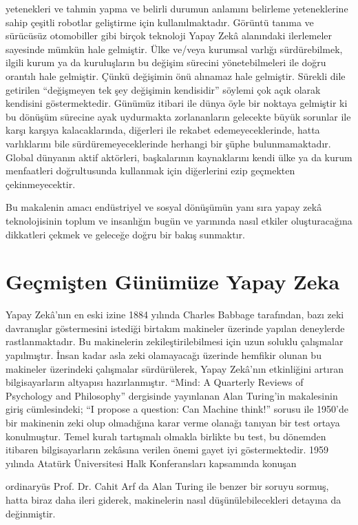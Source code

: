 \documentclass{article}
\begin{document}
\begin{multicols}{2}
yetenekleri ve tahmin yapma ve belirli durumun anlamını belirleme yeteneklerine sahip çeşitli robotlar geliştirme için kullanılmaktadır. Görüntü tanıma ve
sürücüsüz otomobiller gibi birçok teknoloji Yapay Zekâ alanındaki ilerlemeler
sayesinde mümkün hale gelmiştir.
 Ülke ve/veya kurumsal varlığı sürdürebilmek, ilgili
kurum ya da kuruluşların bu değişim sürecini yönetebilmeleri ile doğru orantılı
hale gelmiştir. Çünkü değişimin önü alınamaz hale gelmiştir. Sürekli dile getirilen “değişmeyen tek şey değişimin kendisidir” söylemi çok açık olarak kendisini göstermektedir. Günümüz itibari ile dünya öyle bir noktaya gelmiştir ki bu
dönüşüm sürecine ayak uydurmakta zorlananların gelecekte büyük sorunlar ile
karşı karşıya kalacaklarında, diğerleri ile rekabet edemeyeceklerinde, hatta varlıklarını bile sürdüremeyeceklerinde herhangi bir şüphe bulunmamaktadır. Global dünyanın aktif aktörleri, başkalarının kaynaklarını kendi ülke ya da kurum
menfaatleri doğrultusunda kullanmak için diğerlerini ezip geçmekten çekinmeyecektir.

\vspace{10pt}
Bu makalenin amacı endüstriyel ve sosyal dönüşümün yanı sıra yapay zekâ teknolojisinin toplum ve insanlığın bugün ve yarınında nasıl etkiler oluşturacağına
dikkatleri çekmek ve geleceğe doğru bir bakış sunmaktır.

\newpage
\section{Geçmişten Günümüze Yapay Zeka}
Yapay Zekâ’nın en eski izine 1884 yılında Charles Babbage tarafından, bazı zeki
davranışlar göstermesini istediği birtakım makineler üzerinde yapılan deneylerde rastlanmaktadır. Bu makinelerin zekileştirilebilmesi için uzun soluklu çalışmalar yapılmıştır. İnsan kadar asla zeki olamayacağı üzerinde hemfikir olunan
bu makineler üzerindeki çalışmalar sürdürülerek, Yapay Zekâ’nın etkinliğini
artıran bilgisayarların altyapısı hazırlanmıştır. “Mind: A Quarterly Reviews of Psychology and Philosophy” dergisinde yayınlanan Alan Turing’in makalesinin giriş
cümlesindeki; “I propose a question: Can Machine think!” sorusu ile 1950’de bir
makinenin zeki olup olmadığına karar verme olanağı tanıyan bir test ortaya konulmuştur. Temel kuralı tartışmalı olmakla birlikte bu test, bu dönemden itibaren bilgisayarların zekâsına verilen önemi gayet iyi göstermektedir. 1959 yılında
Atatürk Üniversitesi Halk Konferansları kapsamında konuşan 

ordinaryüs Prof.
Dr. Cahit Arf da Alan Turing ile benzer bir soruyu sormuş, hatta biraz daha ileri
giderek, makinelerin nasıl düşünülebilecekleri detayına da değinmiştir.


\end{multicols}
\end{document}
